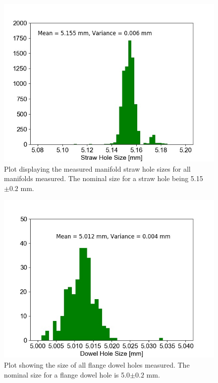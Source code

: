 \begin{figure}[!h]
\centering 
\includegraphics[scale=0.6]{Figures/strawholesizes.jpeg}
\decoRule
\caption{Plot displaying the measured manifold straw hole sizes for all manifolds measured. The nominal size for a straw hole being 5.15$\pm0.2$ mm. }
\label{fig:strawholesizes}
\end{figure}

\begin{figure}[!h]
\centering 
\includegraphics[scale=0.6]{Figures/dowelholesizes.jpeg}
\decoRule
\caption{Plot showing the size of all flange dowel holes measured. The nominal size for a flange dowel hole is 5.0$\pm0.2$ mm.}
\label{fig:dowelholesizes}
\end{figure}

